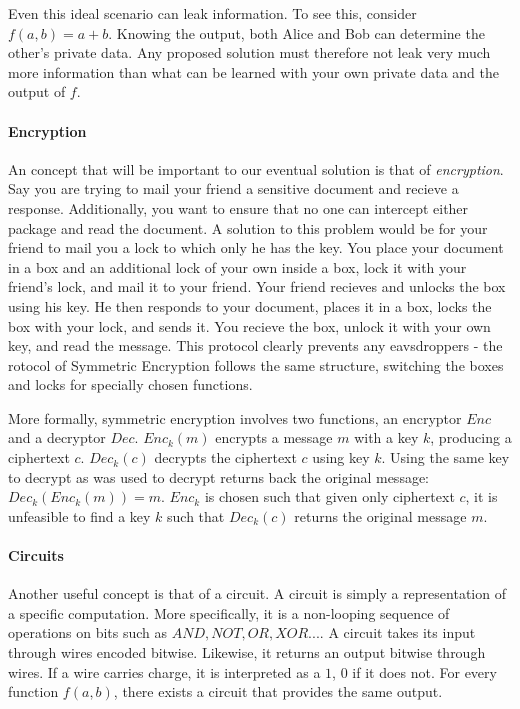 Even this ideal scenario can leak information. To see this, consider $f(a, b) = a + b$. Knowing the output, both Alice and Bob can determine the other's private data. Any proposed solution must therefore not leak very much more information than what can be learned with your own private data and the output of $f$. 

\paragraph{Encryption}
An concept that will be important to our eventual solution is that of \textit{encryption}. Say you are trying to mail your friend a sensitive document and recieve a response. Additionally, you want to ensure that no one can intercept either package and read the document. A solution to this problem would be for your friend to mail you a lock to which only he has the key. You place your document in a box and an additional lock of your own inside a box, lock it with your friend's lock, and mail it to your friend. Your friend recieves and unlocks the box using his key. He then responds to your document, places it in a box, locks the box with your lock, and sends it. You recieve the box, unlock it with your own key, and read the message. This protocol clearly prevents any eavsdroppers - the rotocol of Symmetric Encryption follows the same structure, switching the boxes and locks for specially chosen functions.

More formally, symmetric encryption involves two functions, an encryptor $Enc$ and a decryptor $Dec$. $Enc_k(m)$ encrypts a message $m$ with a key $k$, producing a ciphertext $c$. $Dec_k(c)$ decrypts the ciphertext $c$ using key $k$. Using the same key to decrypt as was used to decrypt returns back the original message: $Dec_k(Enc_k(m)) = m$. $Enc_k$ is chosen such that given only ciphertext $c$, it is unfeasible to find a key $k$ such that $Dec_k(c)$ returns the original message $m$.

\paragraph{Circuits}
Another useful concept is that of a circuit. A circuit is simply a representation of a specific computation. More specifically, it is a non-looping sequence of operations on bits such as $AND, NOT, OR, XOR...$. A circuit takes its input through wires encoded bitwise. Likewise, it returns an output bitwise through wires. If a wire carries charge, it is interpreted as a $1$, $0$ if it does not. For every function $f(a,b)$, there exists a circuit that provides the same output.

